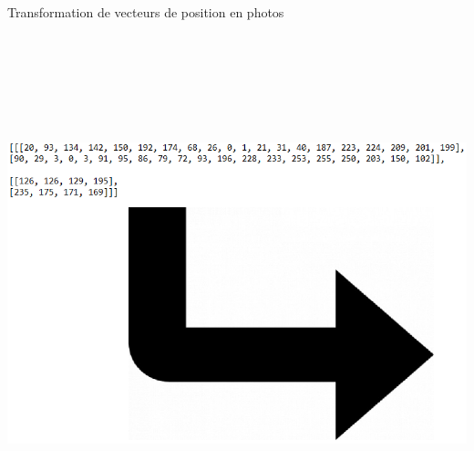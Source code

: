 



\vspace{-2mm}




\begin{center}
Transformation de vecteurs de position en photos
\end{center}

\begin{center}

\includegraphics[width=15cm,height=15cm,keepaspectratio]{figures/vecteur_fleche.png}

\end{center}
